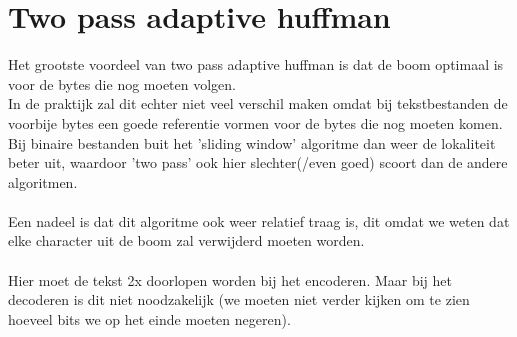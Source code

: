 \documentclass[a4paper,12pt]{report}
\begin{document}
\section{Two pass adaptive huffman}
Het grootste voordeel van two pass adaptive huffman is dat de boom optimaal is voor de bytes die nog moeten volgen.\\ 
In de praktijk zal dit echter niet veel verschil maken omdat bij tekstbestanden de voorbije bytes een goede referentie vormen voor de bytes die nog moeten komen. Bij binaire bestanden buit het 'sliding window' algoritme dan weer de lokaliteit beter uit, waardoor 'two pass' ook hier slechter(/even goed) scoort dan de andere algoritmen. \\ \\
Een nadeel is dat dit algoritme ook weer relatief traag is, dit omdat we weten dat elke character uit de boom zal verwijderd moeten worden. \\ \\
Hier moet de tekst 2x doorlopen worden bij het encoderen. Maar bij het decoderen is dit niet noodzakelijk (we moeten niet verder kijken om te zien hoeveel bits we op het einde moeten negeren).
\end{document}
